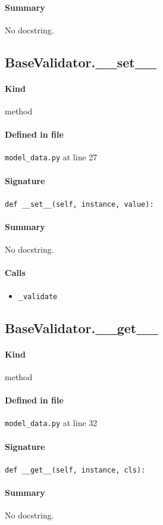\documentclass[11pt]{report}
\begin{document}
\paragraph{Summary} No docstring.
\subsection{BaseValidator.\_\_set\_\_}
\label{def:model_data.py:BaseValidator.__set__:L27}
\paragraph{Kind} method
\paragraph{Defined in file} \texttt{model\_data.py} at line 27
\paragraph{Signature} \texttt{def \_\_set\_\_(self, instance, value):}
\paragraph{Summary} No docstring.
\paragraph{Calls}
\begin{itemize}[leftmargin=*]
  \item \texttt{\_validate}
\end{itemize}
\subsection{BaseValidator.\_\_get\_\_}
\label{def:model_data.py:BaseValidator.__get__:L32}
\paragraph{Kind} method
\paragraph{Defined in file} \texttt{model\_data.py} at line 32
\paragraph{Signature} \texttt{def \_\_get\_\_(self, instance, cls):}
\paragraph{Summary} No docstring.
\end{document}
